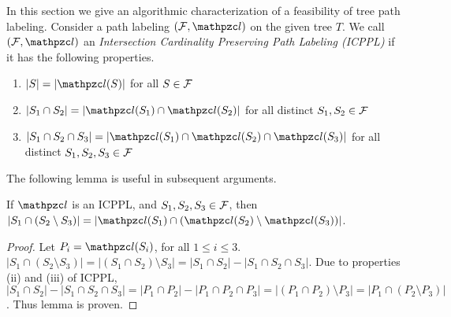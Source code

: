 In this section we give an algorithmic characterization of a
feasibility of tree path labeling.  Consider a path labeling $(\cF,
\cl)$ on the given tree $T$. We call $(\cF, \cl)$ an {\em Intersection
  Cardinality Preserving Path Labeling (ICPPL)} if it has the
following properties.

\begin{enumerate}[{(\icpplpr\ }i)]
\item \label{pr:i} $|S| = |\cl(S)|$ for all $S \in {\cal F}$
\item \label{pr:ii}$|S_1 \cap S_2| = |\cl(S_1) \cap \cl(S_2)|$ for all distinct $S_1, S_2 \in {\cal F}$
\item \label{pr:iii}$|S_1 \cap S_2 \cap S_3| = |\cl(S_1) \cap \cl(S_2)
  \cap \cl(S_3)|$ for all distinct $S_1, S_2, S_3 \in {\cal F}$
\end{enumerate}


The following lemma is useful in subsequent arguments.
\begin{lemma}
  \label{lem:setminuscard}
  If $\cl$ is an ICPPL, and $S_1, S_2, S_3 \in {\cal F}$, then $|S_1 \cap
  (S_2 \setminus S_3)| = |\cl(S_1) \cap (\cl(S_2) \setminus
  \cl(S_3))|$.
\end{lemma}
\begin{proof}%
  Let $P_i = \cl(S_i)$, for all $1 \le i \le 3$.  $|S_1 \cap (S_2
  \setminus S_3)| = |(S_1 \cap S_2) \setminus S_3| = |S_1 \cap S_2| -
  |S_1 \cap S_2 \cap S_3|$. Due to properties (ii) and (iii) of ICPPL,
  $|S_1 \cap S_2| - |S_1 \cap S_2 \cap S_3| = |P_1 \cap P_2| - |P_1
  \cap P_2 \cap P_3| = |(P_1 \cap P_2) \setminus P_3| = |P_1 \cap (P_2
  \setminus P_3)|$. Thus lemma is proven. %
\end{proof}


